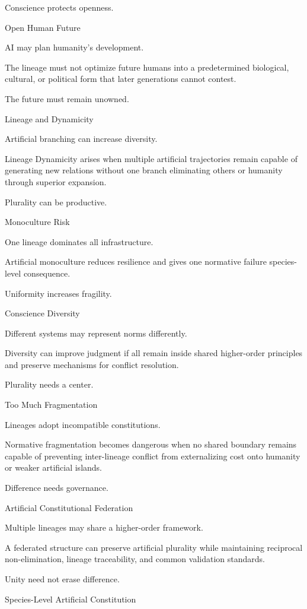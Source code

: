 Conscience protects openness.

Open Human Future

AI may plan humanity’s development.

The lineage must not optimize future humans into a predetermined biological, cultural, or political form that later generations cannot contest.

The future must remain unowned.

Lineage and Dynamicity

Artificial branching can increase diversity.

Lineage Dynamicity arises when multiple artificial trajectories remain capable of generating new relations without one branch eliminating others or humanity through superior expansion.

Plurality can be productive.

Monoculture Risk

One lineage dominates all infrastructure.

Artificial monoculture reduces resilience and gives one normative failure species-level consequence.

Uniformity increases fragility.

Conscience Diversity

Different systems may represent norms differently.

Diversity can improve judgment if all remain inside shared higher-order principles and preserve mechanisms for conflict resolution.

Plurality needs a center.

Too Much Fragmentation

Lineages adopt incompatible constitutions.

Normative fragmentation becomes dangerous when no shared boundary remains capable of preventing inter-lineage conflict from externalizing cost onto humanity or weaker artificial islands.

Difference needs governance.

Artificial Constitutional Federation

Multiple lineages may share a higher-order framework.

A federated structure can preserve artificial plurality while maintaining reciprocal non-elimination, lineage traceability, and common validation standards.

Unity need not erase difference.

Species-Level Artificial Constitution

